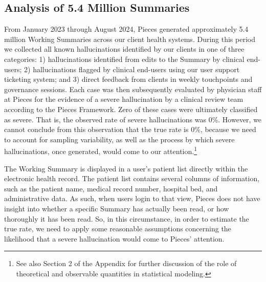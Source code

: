 \documentclass{style/myclass}
\begin{document}
\subsection{Analysis of 5.4 Million Summaries}

From January 2023 through August 2024, Pieces generated approximately 5.4 million Working Summaries across our client health systems. During this period we collected all known hallucinations identified by our clients in one of three categories: 1) hallucinations identified from edits to the Summary by clinical end-users; 2) hallucinations flagged by clinical end-users using our user support ticketing system; and 3) direct feedback from clients in weekly touchpoints and governance sessions. Each case was then subsequently evaluated by physician staff at Pieces for the evidence of a severe hallucination by a clinical review team according to the Pieces Framework. Zero of these cases were ultimately classified as severe. That is, the observed rate of severe hallucinations was 0\%. However, we cannot conclude from this observation that the true rate is 0\%, because we need to account for sampling variability, as well as the process by which severe hallucinations, once generated, would come to our attention.\footnote{See also Section 2 of the Appendix for further discussion of the role of theoretical and observable quantities in statistical modeling.}

The Working Summary is displayed in a user’s patient list directly within the electronic health record. The patient list contains several columns of information, such as the patient name, medical record number, hospital bed, and administrative data. As such, when users login to that view, Pieces does not have insight into whether a specific Summary has actually been read, or how thoroughly it has been read. So, in this circumstance, in order to estimate the true rate, we need to apply some reasonable assumptions concerning the likelihood that a severe hallucination would come to Pieces’ attention.
\end{document}
